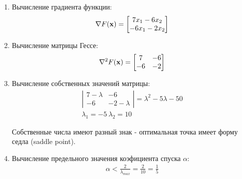 \documentclass[a4paper]{report}
\begin{document}
\begin{enumerate}
    \item Вычисление градиента функции:
        \begin{eqnarray}
            \nabla F({\bf x}) =
            \left[
                \begin{matrix}
                    7x_1-6x_2 \\
                    -6x_1-2x_2
                \end{matrix}
            \right]
        \end{eqnarray}

    \item Вычисление матрицы Гессе:
        \begin{eqnarray}
            \nabla^2 F({\bf x}) = \left[
                \begin{matrix}
                    7 & -6 \\
                    -6 & -2
                \end{matrix}
            \right]
        \end{eqnarray}

    \item Вычисление собственных значений матрицы:
        \begin{eqnarray}
           \left| 
                \begin{matrix}
                    7 - \lambda & -6 \\
                    -6 & -2 - \lambda
                \end{matrix}
           \right| = \lambda^2 - 5\lambda - 50 \\
           \lambda_1 = -5 \ \lambda_2 = 10
        \end{eqnarray}

        Собственные числа имеют разный знак - оптимальная точка имеет форму седла (saddle point).

    \item Вычисление предельного значения коэфициента спуска ${\alpha}$:
        \begin{eqnarray}
            \alpha < \frac{2}{\lambda_{max}} = \frac{2}{10} = \frac{1}{5}
        \end{eqnarray}


\end{enumerate}
\end{document}
